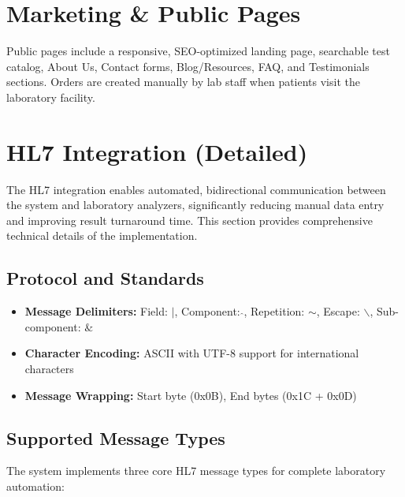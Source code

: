 \documentclass[12pt, a4paper]{report}
\begin{document}
\section{Marketing \& Public Pages}
Public pages include a responsive, SEO-optimized landing page, searchable test catalog, About Us, Contact forms, Blog/Resources, FAQ, and Testimonials sections. Orders are created manually by lab staff when patients visit the laboratory facility.

\section{HL7 Integration (Detailed)}
The HL7 integration enables automated, bidirectional communication between the system and laboratory analyzers, significantly reducing manual data entry and improving result turnaround time. This section provides comprehensive technical details of the implementation.

\subsection{Protocol and Standards}
\begin{itemize}

    \item \textbf{Message Delimiters:} Field: $|$, Component: $\hat{}$, Repetition: $\sim$, Escape: $\backslash$, Sub-component: $\&$
    \item \textbf{Character Encoding:} ASCII with UTF-8 support for international characters
    \item \textbf{Message Wrapping:} Start byte (0x0B), End bytes (0x1C + 0x0D)
\end{itemize}

\subsection{Supported Message Types}
The system implements three core HL7 message types for complete laboratory automation:
\end{document}
